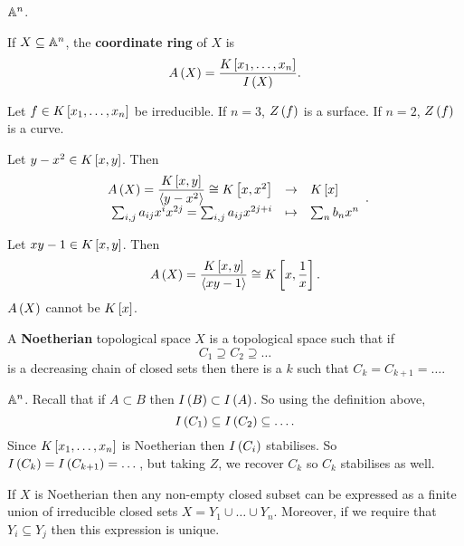\begin{example1}
$ \A^n $.
\end{example1}

\begin{definition}
If $ X \subseteq \A^n $, the \textbf{coordinate ring} of $ X $ is
$$ A\rb{X} = \dfrac{K\sb{x_1, \dots, x_n}}{I\rb{X}}. $$
\end{definition}


\begin{example1}
Let $ f \in K\sb{x_1, \dots, x_n} $ be irreducible. If $ n = 3 $, $ Z\rb{f} $ is a surface. If $ n = 2 $, $ Z\rb{f} $ is a curve.
\end{example1}

\begin{example1}
Let $ y - x^2 \in K\sb{x, y} $. Then
$$ \function{A\rb{X} = \dfrac{K\sb{x, y}}{\ab{y - x^2}} \cong K\sb{x, x^2}}{K\sb{x}}{\sum_{i, j} a_{ij}x^ix^{2j} = \sum_{i, j} a_{ij}x^{2j + i}}{\sum_n b_nx^n}. $$
\end{example1}

\begin{example1}
Let $ xy - 1 \in K\sb{x, y} $. Then
$$ A\rb{X} = \dfrac{K\sb{x, y}}{\ab{xy - 1}} \cong K\sb{x, \dfrac{1}{x}}. $$
$ A\rb{X} $ cannot be $ K\sb{x} $.
\end{example1}

\begin{definition}
A \textbf{Noetherian} topological space $ X $ is a topological space such that if
$$ C_1 \supseteq C_2 \supseteq \dots $$
is a decreasing chain of closed sets then there is a $ k $ such that $ C_k = C_{k + 1} = \dots $.
\end{definition}

\begin{example1}
$ \A^n $. Recall that if $ A \subset B $ then $ I\rb{B} \subset I\rb{A} $. So using the definition above,
$$ I\rb{C_1} \subseteq I\rb{C_2} \subseteq \dots. $$
Since $ K\sb{x_1, \dots, x_n} $ is Noetherian then $ I\rb{C_i} $ stabilises. So $ I\rb{C_k} = I\rb{C_{k + 1}} = \dots $, but taking $ Z $, we recover $ C_k $ so $ C_k $ stabilises as well.
\end{example1}

\begin{theorem}
If $ X $ is Noetherian then any non-empty closed subset can be expressed as a finite union of irreducible closed sets $ X = Y_1 \cup \dots \cup Y_n $. Moreover, if we require that $ Y_i \subseteq Y_j $ then this expression is unique.
\end{theorem}

